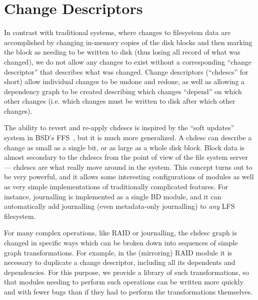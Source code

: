 \section{Change Descriptors}
\label{sec:chdescs}

In contrast with traditional systems, where changes to filesystem data are
accomplished by changing in-memory copies of the disk blocks and then marking
the block as needing to be written to disk (thus losing all record of what was
changed), we do not allow any changes to exist without a corresponding ``change
descriptor'' that describes what was changed. Change descriptors (``chdescs''
for short) allow individual changes to be undone and redone, as well as allowing
a dependency graph to be created describing which changes ``depend'' on which
other changes (i.e. which changes must be written to disk after which other
changes).

The ability to revert and re-apply chdescs is inspired by the ``soft updates''
system in BSD's FFS~\cite{ganger00soft}, but it is much more generalized. A
chdesc can describe a change as small as a single bit, or as large as a whole
disk block. Block data is almost secondary to the chdescs from the point of view
of the file system server --- chdescs are what really move around in the system.
This concept turns out to be very powerful, and it allows some interesting
configurations of modules as well as very simple implementations of
traditionally complicated features. For instance, journalling is implemented as
a single BD module, and it can automatically add journalling (even metadata-only
journalling) to {\it any} LFS filesystem.

For many complex operations, like RAID or journalling, the chdesc graph is
changed in specific ways which can be broken down into sequences of simple graph
transformations. For example, in the (mirroring) RAID module it is necessary to
duplicate a change descriptor, including all its dependents and dependencies.
For this purpose, we provide a library of such transformations, so that modules
needing to perform such operations can be written more quickly and with fewer
bugs than if they had to perform the transformations themselves.
